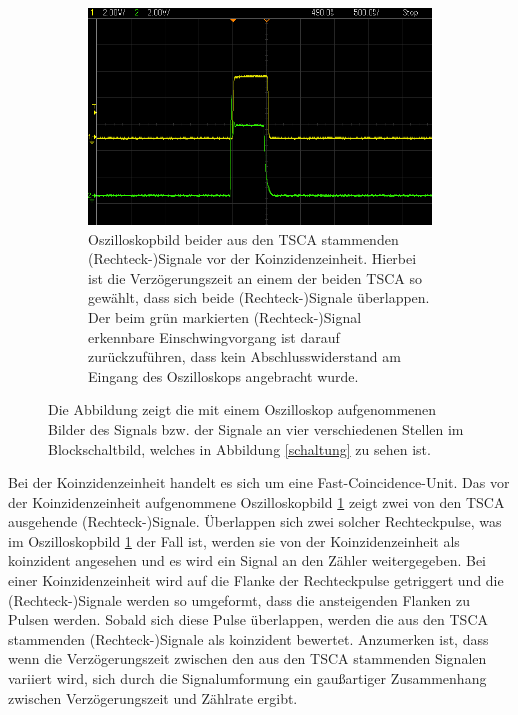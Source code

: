 \begin{figure}[H]
\begin{subfigure}[t]{0.495\textwidth}
		\centering
		\includegraphics[width=\textwidth]{img/BeideSignaleVorKoinzidenzeinheit}
		\caption{Oszilloskopbild beider aus den TSCA stammenden (Rechteck-)Signale vor der Koinzidenzeinheit. Hierbei ist die Verzögerungszeit an einem der beiden TSCA so gewählt, dass sich beide (Rechteck-)Signale überlappen. Der beim grün markierten (Rechteck-)Signal erkennbare Einschwingvorgang ist darauf zurückzuführen, dass kein Abschlusswiderstand am Eingang des Oszilloskops angebracht wurde.}
		\label{BeideSignaleVorKoinzidenzeinheit}
	\end{subfigure}
	\caption{Die Abbildung zeigt die mit einem Oszilloskop aufgenommenen Bilder des Signals bzw. der Signale an vier verschiedenen Stellen im Blockschaltbild, welches in Abbildung \ref{schaltung} zu sehen ist.}
	\label{Oszilloskopbilder}
\end{figure}

Bei der Koinzidenzeinheit handelt es sich um eine \glqq Fast-Coincidence-Unit\grqq .
Das vor der Koinzidenzeinheit aufgenommene Oszilloskopbild \ref{BeideSignaleVorKoinzidenzeinheit} zeigt zwei von den TSCA ausgehende (Rechteck-)Signale.
Überlappen sich zwei solcher Rechteckpulse, was im Oszilloskopbild \ref{BeideSignaleVorKoinzidenzeinheit} der Fall ist, werden sie von der Koinzidenzeinheit als koinzident angesehen und es wird ein Signal an den Zähler weitergegeben.
Bei einer Koinzidenzeinheit wird auf die Flanke der Rechteckpulse getriggert und die (Rechteck-)Signale werden so umgeformt, dass die ansteigenden Flanken zu Pulsen werden.
Sobald sich diese Pulse überlappen, werden die aus den TSCA stammenden (Rechteck-)Signale als koinzident bewertet.
Anzumerken ist, dass wenn die Verzögerungszeit zwischen den aus den TSCA stammenden Signalen variiert wird, sich durch die Signalumformung ein gaußartiger Zusammenhang zwischen Verzögerungszeit und Zählrate ergibt.

